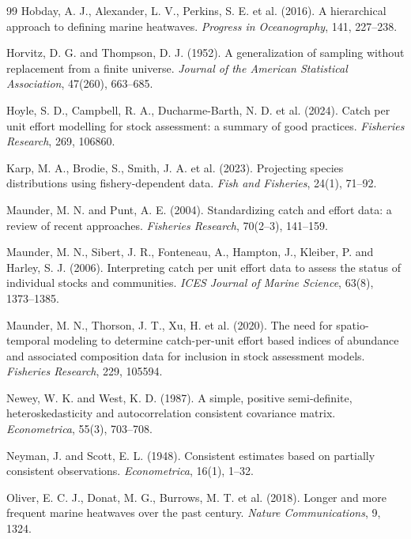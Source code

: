 \begin{thebibliography}{99}
Hobday, A. J., Alexander, L. V., Perkins, S. E. et al. (2016). A hierarchical approach to defining marine heatwaves. \textit{Progress in Oceanography}, 141, 227--238.

Horvitz, D. G. and Thompson, D. J. (1952). A generalization of sampling without replacement from a finite universe. \textit{Journal of the American Statistical Association}, 47(260), 663--685.

Hoyle, S. D., Campbell, R. A., Ducharme-Barth, N. D. et al. (2024). Catch per unit effort modelling for stock assessment: a summary of good practices. \textit{Fisheries Research}, 269, 106860.

Karp, M. A., Brodie, S., Smith, J. A. et al. (2023). Projecting species distributions using fishery-dependent data. \textit{Fish and Fisheries}, 24(1), 71--92.

Maunder, M. N. and Punt, A. E. (2004). Standardizing catch and effort data: a review of recent approaches. \textit{Fisheries Research}, 70(2--3), 141--159.

Maunder, M. N., Sibert, J. R., Fonteneau, A., Hampton, J., Kleiber, P. and Harley, S. J. (2006). Interpreting catch per unit effort data to assess the status of individual stocks and communities. \textit{ICES Journal of Marine Science}, 63(8), 1373--1385.

Maunder, M. N., Thorson, J. T., Xu, H. et al. (2020). The need for spatio-temporal modeling to determine catch-per-unit effort based indices of abundance and associated composition data for inclusion in stock assessment models. \textit{Fisheries Research}, 229, 105594.

Newey, W. K. and West, K. D. (1987). A simple, positive semi-definite, heteroskedasticity and autocorrelation consistent covariance matrix. \textit{Econometrica}, 55(3), 703--708.

Neyman, J. and Scott, E. L. (1948). Consistent estimates based on partially consistent observations. \textit{Econometrica}, 16(1), 1--32.

Oliver, E. C. J., Donat, M. G., Burrows, M. T. et al. (2018). Longer and more frequent marine heatwaves over the past century. \textit{Nature Communications}, 9, 1324.


\end{thebibliography}
